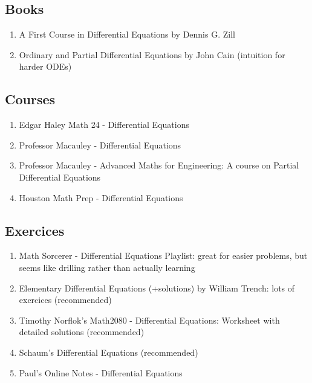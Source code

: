 \documentclass{article}
\begin{document}
\subsection{Books}%
\label{sub:Books}

\begin{enumerate}
    \item A First Course in Differential Equations by Dennis G. Zill
    \item Ordinary and Partial Differential Equations by John Cain (intuition for harder ODEs)
\end{enumerate}

\subsection{Courses}%
\label{sub:Courses}

\begin{enumerate}
    \item Edgar Haley Math 24 - Differential Equations
    \item Professor Macauley - Differential Equations
    \item Professor Macauley - Advanced Maths for Engineering: A course
	on Partial Differential Equations
    \item Houston Math Prep - Differential Equations
\end{enumerate}

\subsection{Exercices}%
\label{sub:Exercices}

\begin{enumerate}
    \item Math Sorcerer - Differential Equations Playlist: great for easier
	problems, but seems like drilling rather than actually learning
    \item Elementary Differential Equations (+solutions) by William Trench:
	lots of exercices (recommended)
    \item Timothy Norflok's Math2080 - Differential Equations: Worksheet
	with detailed solutions (recommended)
    \item Schaum's Differential Equations (recommended)
    \item Paul's Online Notes - Differential Equations
\end{enumerate}

\pagebreak
\end{document}
